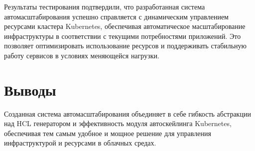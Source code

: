 Результаты тестирования подтвердили, что разработанная система
автомасштабирования успешно справляется с
динамическим управлением ресурсами кластера Kubernetes, обеспечивая
автоматическое масштабирование инфраструктуры в
соответствии с текущими потребностями приложений. Это позволяет оптимизировать
использование ресурсов и поддерживать стабильную
работу сервисов в условиях меняющейся нагрузки.

\section{Выводы}

Созданная система автомасштабирования объединяет в себе гибкость абстракции над
HCL генератором и эффективность модуля автоскейлинга Kubernetes, обеспечивая тем
самым удобное и мощное решение для управления инфраструктурой и ресурсами в
облачных средах.